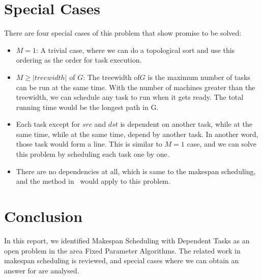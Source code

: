 \documentclass{article}
\begin{document}
\section{Special Cases}
There are four special cases of this problem that show promise to be solved:
\begin{itemize}
\item $M = 1$: A trivial case, where we can do a topological sort and use this
ordering as the order for task execution.
  \item $M \geq |treewidth|$ of $G$: The treewidth of$G$ is the maximum
  number of tasks can be run at the same time. With the number of machines
  greater than the treewidth, we can schedule any task to run when it
  gets ready. The total running time would be the longest path in G.
\item Each task except for $src$ and $dst$ is dependent on another task,
while at the same time, while at the same time, depend by another task.
In another word, those task would form a line. This is similar to $M=1$
case, and we can solve this problem by scheduling each task one by one.
\item There are no dependencies at all, which is same to the makespan
scheduling, and the method in~\cite{mnich2015scheduling} would apply
to this problem.
\end{itemize}

\section{Conclusion}
In this report, we identified Makespan Scheduling with Dependent
Tasks as an open problem in the area Fixed Parameter Algorithms. The related work
in makespan scheduling is reviewed, and special cases where we can
obtain an answer for are analysed.



\end{document}
